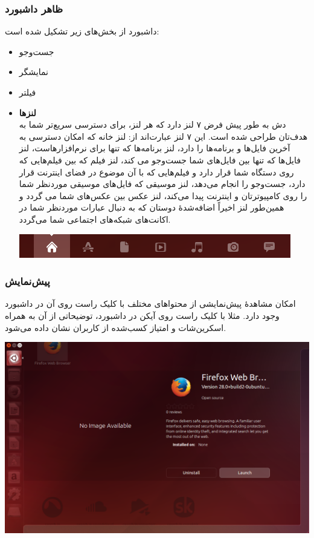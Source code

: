 \subsubsection{ظاهر داشبورد}
داشبورد از بخش‌های زیر تشکیل شده است:
\begin{itemize}
\item جست‌وجو
\item نمایشگر
\item فیلتر
\item \textbf{لنزها}\\
دش به طور پیش فرض ۷ لنز دارد که هر لنز، برای دسترسی سریع‌تر شما به هدف‌تان طراحی شده است. این ۷ لنز عبارت‌اند از: لنز خانه که امکان دسترسی به آخرین فایل‌ها و برنامه‌ها را دارد، لنز برنامه‌ها که تنها برای نرم‌افزارهاست، لنز فایل‌ها که تنها بین فایل‌های شما جست‌وجو می کند، لنز فیلم که بین فیلم‌هایی که روی دستگاه شما قرار دارد و فیلم‌هایی که با آن موضوع در فضای اینترنت قرار دارد، جست‌وجو را انجام می‌دهد، لنز موسیقی که فایل‌های موسیقی موردنظر شما را روی کامپیوترتان و اینترنت پیدا می‌کند، لنز عکس بین عکس‌های شما می گردد و همین‌طور لنز اخیراً اضافه‌شدهٔ دوستان که به دنبال عبارات موردنظر شما در اکانت‌های شبکه‌های اجتماعی شما می‌گردد.
\begin{center}
\includegraphics[scale=0.65]{pics/24.png}
\end{center}

\end{itemize}

\subsubsection{پیش‌نمایش}
امکان مشاهدهٔ پیش‌نمایشی از محتواهای مختلف با کلیک راست روی آن در داشبورد وجود دارد. مثلا با کلیک راست روی آیکن  در داشبورد، توضیحاتی از آن به همراه اسکرین‌شات و امتیاز کسب‌شده از کاربران نشان داده می‌شود.

\begin{center}
\includegraphics[scale=0.45]{pics/25.png}
\end{center}


